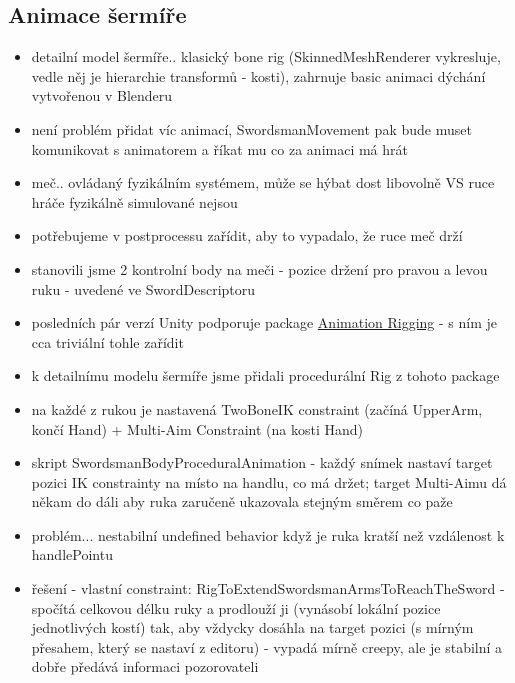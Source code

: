 \subsection{Animace šermíře} \label{swordsmanAnimationSubsection}
\begin{itemize}
  \item detailní model šermíře.. klasický bone rig (SkinnedMeshRenderer vykresluje, vedle něj je hierarchie transformů - kosti), zahrnuje basic animaci dýchání vytvořenou v Blenderu
  \item není problém přidat víc animací, SwordsmanMovement pak bude muset komunikovat s animatorem a říkat mu co za animaci má hrát
  \item meč.. ovládaný fyzikálním systémem, může se hýbat dost libovolně VS ruce hráče fyzikálně simulované nejsou
  \item potřebujeme v postprocessu zařídit, aby to vypadalo, že ruce meč drží
  \item stanovili jsme 2 kontrolní body na meči - pozice držení pro pravou a levou ruku - uvedené ve SwordDescriptoru
  \item posledních pár verzí Unity podporuje package \href{https://docs.unity3d.com/Packages/com.unity.animation.rigging@1.3/manual/index.html}{Animation Rigging} - s ním je cca triviální tohle zařídit
  \item k detailnímu modelu šermíře jsme přidali procedurální Rig z tohoto package
  \item na každé z rukou je nastavená TwoBoneIK constraint (začíná UpperArm, končí Hand) + Multi-Aim Constraint (na kosti Hand)
  \item skript SwordsmanBodyProceduralAnimation - každý snímek nastaví target pozici IK constrainty na místo na handlu, co má držet; target Multi-Aimu dá někam do dáli aby ruka zaručeně ukazovala stejným směrem co paže 
  \item problém... nestabilní undefined behavior když je ruka kratší než vzdálenost k handlePointu
  \item řešení - vlastní constraint: RigToExtendSwordsmanArmsToReachTheSword - spočítá celkovou délku ruky a prodlouží ji (vynásobí lokální pozice jednotlivých kostí) tak, aby vždycky dosáhla na target pozici (s mírným přesahem, který se nastaví z editoru) - vypadá mírně creepy, ale je stabilní a dobře předává informaci pozorovateli
\end{itemize}


